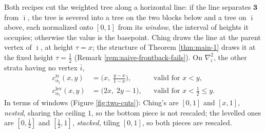 \documentclass[12pt]{amsart}
\theoremstyle{definition}
\theoremstyle{remark}
\begin{document}
Both recipes cut the weighted tree along a horizontal line: if the line separates $\mathbf{3}$ from $\overline{\imath}$, the tree is severed into a tree on the two blocks below and a tree on $\overline{\imath}$ above, each normalized onto $[0,1]$ from its \emph{window}, the interval of heights it occupies; otherwise the value is the basepoint. Ching draws the line at the parent vertex of $\overline{\imath}$, at height $\tau = x$; the structure of Theorem \ref{thm:main-1} draws it at the fixed height $\tau=\tfrac12$ (Remark \ref{rem:naive-frontback-fails}). On $\nabla^2_i$, the other strata having no vertex $\overline{i}$,
\begin{align}
    c^{\mathrm{tr}}_{\alpha_i}(x,y) &= \Big( x,\; \frac{y-x}{1-x} \Big), &&\text{valid for } x < y, \label{eq:tr-cut-3}\\
    c^{\mathrm{lev}}_{\alpha_i}(x,y) &= \big( 2x,\; 2y-1 \big), && \text{valid for } x < \tfrac12 \leq y. \label{eq:lev-cut-3}
\end{align}
In terms of windows (Figure \ref{fig:two-cuts}): Ching's are $[0,1]$ and $[x,1]$, \emph{nested}, sharing the ceiling $1$, so the bottom piece is not rescaled; the levelled ones are $[0,\tfrac12]$ and $[\tfrac12,1]$, \emph{stacked}, tiling $[0,1]$, so both pieces are rescaled.
\end{document}
